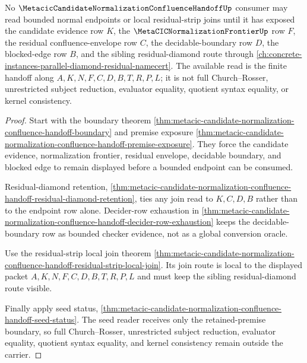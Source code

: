 \begin{theorem}
\label{thm:metacic-candidate-normalization-handoff-orphan-route}
No $\MetacicCandidateNormalizationConfluenceHandoffUp$ consumer may read bounded normal endpoints or local residual-strip joins until it has exposed the candidate evidence row $K$, the $\MetaCICNormalizationFrontierUp$ row $F$, the residual confluence-envelope row $C$, the decidable-boundary row $D$, the blocked-edge row $B$, and the sibling residual-diamond route through \autoref{ch:concrete-instances-parallel-diamond-residual-namecert}. The available read is the finite handoff along $A,K,N,F,C,D,B,T,R,P,L$; it is not full Church--Rosser, unrestricted subject reduction, evaluator equality, quotient syntax equality, or kernel consistency.
\end{theorem}
\begin{proof}
Start with the boundary theorem \autoref{thm:metacic-candidate-normalization-confluence-handoff-boundary} and premise exposure \autoref{thm:metacic-candidate-normalization-confluence-handoff-premise-exposure}. They force the candidate evidence, normalization frontier, residual envelope, decidable boundary, and blocked edge to remain displayed before a bounded endpoint can be consumed.

Residual-diamond retention, \autoref{thm:metacic-candidate-normalization-confluence-handoff-residual-diamond-retention}, ties any join read to $K,C,D,B$ rather than to the endpoint row alone. Decider-row exhaustion in \autoref{thm:metacic-candidate-normalization-confluence-handoff-decider-row-exhaustion} keeps the decidable-boundary row as bounded checker evidence, not as a global conversion oracle.

Use the residual-strip local join theorem \autoref{thm:metacic-candidate-normalization-confluence-handoff-residual-strip-local-join}. Its join route is local to the displayed packet $A,K,N,F,C,D,B,T,R,P,L$ and must keep the sibling residual-diamond route visible.

Finally apply seed status, \autoref{thm:metacic-candidate-normalization-confluence-handoff-seed-status}. The seed reader receives only the retained-premise boundary, so full Church--Rosser, unrestricted subject reduction, evaluator equality, quotient syntax equality, and kernel consistency remain outside the carrier.
\end{proof}

